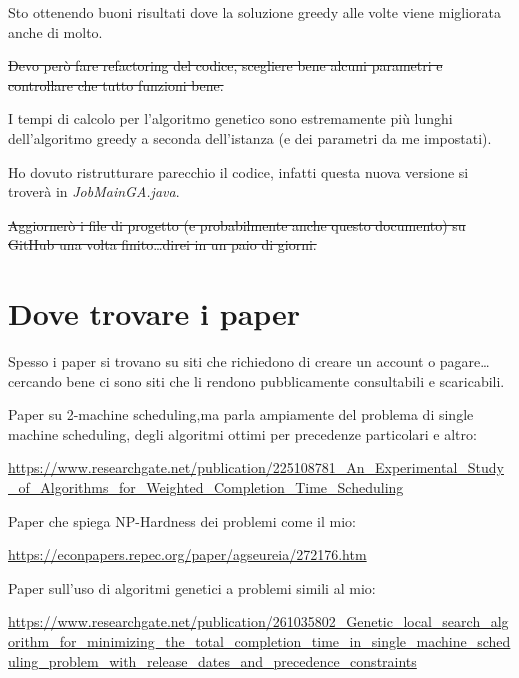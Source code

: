 \documentclass[12pt, letterpaper]{article}
\begin{document}
Sto ottenendo buoni risultati dove la soluzione greedy alle volte viene migliorata anche di molto.

\sout{Devo però fare refactoring del codice, scegliere bene alcuni parametri e controllare che tutto funzioni bene.}

I tempi di calcolo per l'algoritmo genetico sono estremamente più lunghi dell'algoritmo greedy a seconda dell'istanza (e dei parametri da me impostati).

Ho dovuto ristrutturare parecchio il codice, infatti questa nuova versione si troverà in \textit{JobMainGA.java}.

\sout{Aggiornerò i file di progetto (e probabilmente anche questo documento) su GitHub una volta finito\ldots direi in un paio di giorni.}

\section{Dove trovare i paper}
Spesso i paper si trovano su siti che richiedono di creare un account o pagare\ldots cercando bene ci sono siti che li rendono pubblicamente consultabili e scaricabili.

Paper su 2-machine scheduling,ma parla ampiamente del problema di single machine scheduling, degli algoritmi ottimi per precedenze particolari e altro\cite{Baev}:

\medskip
\url{https://www.researchgate.net/publication/225108781_An_Experimental_Study_of_Algorithms_for_Weighted_Completion_Time_Scheduling}

\medskip
Paper che spiega NP-Hardness dei problemi come il mio\cite{Lenstra}: 

\medskip
\url{https://econpapers.repec.org/paper/agseureia/272176.htm}

\medskip
Paper sull'uso di algoritmi genetici a problemi simili al mio\cite{Zaidi}: 

\medskip
\url{https://www.researchgate.net/publication/261035802_Genetic_local_search_algorithm_for_minimizing_the_total_completion_time_in_single_machine_scheduling_problem_with_release_dates_and_precedence_constraints}

\printbibliography
\end{document}
